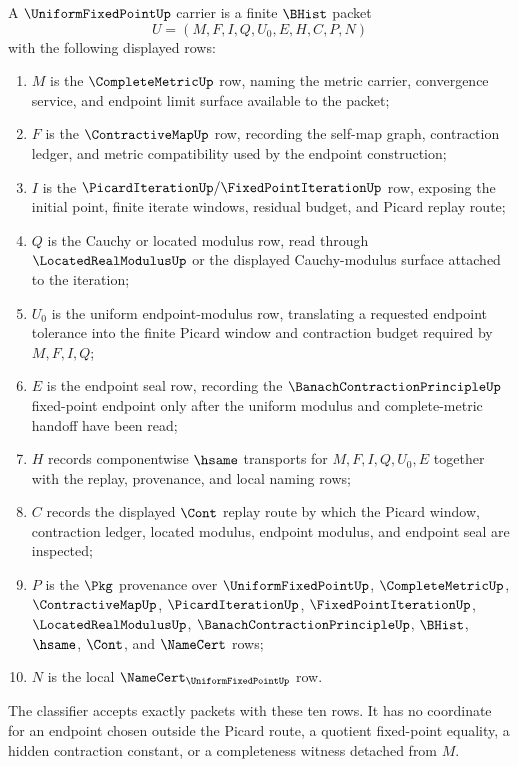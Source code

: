 \begin{definition}
\label{def:uniform-fixed-point-carrier}
A $\UniformFixedPointUp$ carrier is a finite $\BHist$ packet
$$
U=(M,F,I,Q,U_0,E,H,C,P,N)
$$
with the following displayed rows:
\begin{enumerate}
\item $M$ is the $\CompleteMetricUp$ row, naming the metric carrier, convergence service, and endpoint limit surface available to the packet;
\item $F$ is the $\ContractiveMapUp$ row, recording the self-map graph, contraction ledger, and metric compatibility used by the endpoint construction;
\item $I$ is the $\PicardIterationUp/\FixedPointIterationUp$ row, exposing the initial point, finite iterate windows, residual budget, and Picard replay route;
\item $Q$ is the Cauchy or located modulus row, read through $\LocatedRealModulusUp$ or the displayed Cauchy-modulus surface attached to the iteration;
\item $U_0$ is the uniform endpoint-modulus row, translating a requested endpoint tolerance into the finite Picard window and contraction budget required by $M,F,I,Q$;
\item $E$ is the endpoint seal row, recording the $\BanachContractionPrincipleUp$ fixed-point endpoint only after the uniform modulus and complete-metric handoff have been read;
\item $H$ records componentwise $\hsame$ transports for $M,F,I,Q,U_0,E$ together with the replay, provenance, and local naming rows;
\item $C$ records the displayed $\Cont$ replay route by which the Picard window, contraction ledger, located modulus, endpoint modulus, and endpoint seal are inspected;
\item $P$ is the $\Pkg$ provenance over $\UniformFixedPointUp$, $\CompleteMetricUp$, $\ContractiveMapUp$, $\PicardIterationUp$, $\FixedPointIterationUp$, $\LocatedRealModulusUp$, $\BanachContractionPrincipleUp$, $\BHist$, $\hsame$, $\Cont$, and $\NameCert$ rows;
\item $N$ is the local $\NameCert_{\UniformFixedPointUp}$ row.
\end{enumerate}
The classifier accepts exactly packets with these ten rows. It has no coordinate for an endpoint chosen outside the Picard route, a quotient fixed-point equality, a hidden contraction constant, or a completeness witness detached from $M$.
\end{definition}

